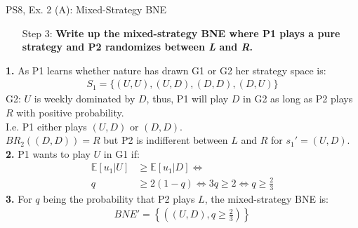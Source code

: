 \begin{frame}{PS8, Ex. 2 (A): Mixed-Strategy BNE}
\begin{multicols}{2}
\begin{itemize}
        \item[Step 3:] \textbf{Write up the mixed-strategy BNE where P1 plays a pure strategy and P2 randomizes between \textit{L} and \textit{R}.}
      \end{itemize}
      \vfill\null\columnbreak
      \textbf{1.} As P1 learns whether nature has drawn G1 or G2 her strategy space is:
      \begin{align*}
        S_1=\{(U,U),(U,D),(D,D),(D,U)\}
      \end{align*}
      G2: $U$ is weekly dominated by $D$, thus, P1 will play $D$ in G2 as long as P2 plays $R$ with positive probability.\\\medskip I.e. P1 either plays $(U,D)$ or $(D,D)$.\\\medskip
      $BR_2((D,D))=R$ but P2 is indifferent between $L$ and $R$ for $s_1'=(U,D)$.\\\medskip
      \textbf{2.} P1 wants to play $U$ in G1 if:
      \begin{align*}
        \mathbb{E}[u_1|U]&\geq \mathbb{E}[u_1|D]\Leftrightarrow\\
        q&\geq2(1-q)\Leftrightarrow 3q\geq2 \Leftrightarrow q\geq\frac{2}{3}
      \end{align*}
      \textbf{3.} For $q$ being the probability that P2 plays $L$, the mixed-strategy BNE is:
      \begin{align*}
        BNE'=\left\{\left((U,D),q\geq\frac{2}{3}\right)\right\}
      \end{align*}
      \vfill\null
    \end{multicols}
\end{frame}
